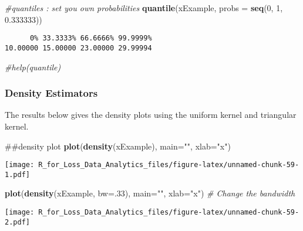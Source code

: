 \documentclass[]{book}
\newenvironment{Shaded}{\begin{snugshade}}{\end{snugshade}}
\newcommand{\KeywordTok}[1]{\textcolor[rgb]{0.13,0.29,0.53}{\textbf{#1}}}
\newcommand{\DataTypeTok}[1]{\textcolor[rgb]{0.13,0.29,0.53}{#1}}
\newcommand{\DecValTok}[1]{\textcolor[rgb]{0.00,0.00,0.81}{#1}}
\newcommand{\FloatTok}[1]{\textcolor[rgb]{0.00,0.00,0.81}{#1}}
\newcommand{\StringTok}[1]{\textcolor[rgb]{0.31,0.60,0.02}{#1}}
\newcommand{\CommentTok}[1]{\textcolor[rgb]{0.56,0.35,0.01}{\textit{#1}}}
\newcommand{\NormalTok}[1]{#1}
\theoremstyle{definition}
\theoremstyle{definition}
\theoremstyle{definition}
\theoremstyle{remark}
\begin{document}
\begin{Shaded}
\begin{Highlighting}[]
\CommentTok{#quantiles : set you own probabilities}
\KeywordTok{quantile}\NormalTok{(xExample, }\DataTypeTok{probs =} \KeywordTok{seq}\NormalTok{(}\DecValTok{0}\NormalTok{, }\DecValTok{1}\NormalTok{, }\FloatTok{0.333333}\NormalTok{))}
\end{Highlighting}
\end{Shaded}

\begin{verbatim}
      0% 33.3333% 66.6666% 99.9999% 
10.00000 15.00000 23.00000 29.99994 
\end{verbatim}

\begin{Shaded}
\begin{Highlighting}[]
\CommentTok{#help(quantile)}
\end{Highlighting}
\end{Shaded}

\subsubsection{Density Estimators}\label{density-estimators}

The results below gives the density plots using the uniform kernel and
triangular kernel.

\begin{Shaded}
\begin{Highlighting}[]
\NormalTok{##density plot }
\KeywordTok{plot}\NormalTok{(}\KeywordTok{density}\NormalTok{(xExample), }\DataTypeTok{main=}\StringTok{""}\NormalTok{, }\DataTypeTok{xlab=}\StringTok{"x"}\NormalTok{)}
\end{Highlighting}
\end{Shaded}

\texttt{[image: R\_for\_Loss\_Data\_Analytics\_files/figure-latex/unnamed-chunk-59-1.pdf]}

\begin{Shaded}
\begin{Highlighting}[]
\KeywordTok{plot}\NormalTok{(}\KeywordTok{density}\NormalTok{(xExample, }\DataTypeTok{bw=}\NormalTok{.}\DecValTok{33}\NormalTok{), }\DataTypeTok{main=}\StringTok{""}\NormalTok{, }\DataTypeTok{xlab=}\StringTok{"x"}\NormalTok{) }\CommentTok{# Change the bandwidth}
\end{Highlighting}
\end{Shaded}

\texttt{[image: R\_for\_Loss\_Data\_Analytics\_files/figure-latex/unnamed-chunk-59-2.pdf]}
\end{document}

